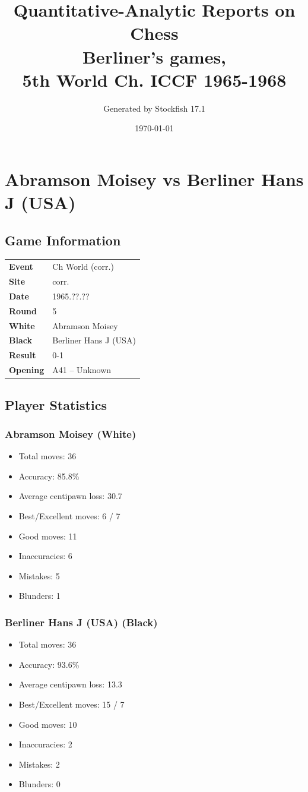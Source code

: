 \documentclass[11pt]{book}
\title{Quantitative-Analytic Reports on Chess\\ Berliner's games, \\ 5th World Ch. ICCF 1965-1968}
\author{Generated by Stockfish 17.1}
\date{\today}
\begin{document}
\maketitle
\tableofcontents

\chapter{Abramson Moisey vs Berliner Hans J (USA)}

\section{Game Information}
\begin{tabular}{ll}
\textbf{Event} & Ch World (corr.) \\
\textbf{Site} & corr. \\
\textbf{Date} & 1965.??.?? \\
\textbf{Round} & 5 \\
\textbf{White} & Abramson Moisey \\
\textbf{Black} & Berliner Hans J (USA) \\
\textbf{Result} & 0-1 \\
\textbf{Opening} & A41 -- Unknown \\
\end{tabular}

\section{Player Statistics}

\subsection{Abramson Moisey (White)}
\begin{itemize}
\item Total moves: 36
\item Accuracy: 85.8\%
\item Average centipawn loss: 30.7
\item Best/Excellent moves: 6 / 7
\item Good moves: 11
\item Inaccuracies: 6
\item Mistakes: 5
\item Blunders: 1
\end{itemize}

\subsection{Berliner Hans J (USA) (Black)}
\begin{itemize}
\item Total moves: 36
\item Accuracy: 93.6\%
\item Average centipawn loss: 13.3
\item Best/Excellent moves: 15 / 7
\item Good moves: 10
\item Inaccuracies: 2
\item Mistakes: 2
\item Blunders: 0
\end{itemize}
\end{document}
